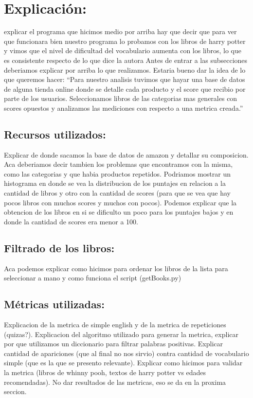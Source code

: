 \documentclass[12pt,journal,compsoc]{IEEEtran}
\begin{document}
\section{Explicación:} 
explicar el programa que hicimos medio por arriba
hay que decir que para ver que funcionara bien nuestro programa lo probamos con los libros de harry potter y vimos que el nivel de dificultad del vocabulario aumenta con los libros, lo que es consistente respecto de lo que dice la autora
Antes de entrar a las subsecciones deberiamos explicar por arriba lo que realizamos. Estaria bueno dar la idea de lo que queremos hacer: ``Para nuestro analisis tuvimos que hayar una base de datos de alguna tienda online donde se detalle cada producto y el score que recibio por parte de los usuarios. Seleccionamos libros de las categorias mas generales con scores opuestos y analizamos las mediciones con respecto a una metrica creada.''
\subsection{Recursos utilizados:}
 Explicar de donde sacamos la base de datos de amazon y detallar su composicion. Aca deberiamos decir tambien los problemas que encontramos con la misma, como las categorias y que habia productos repetidos. Podriamos mostrar un histograma en donde se vea la distribucion de los puntajes en relacion a la cantidad de libros y otro con la cantidad de scores (para que se vea que hay pocos libros con muchos scores y muchos con pocos). Podemos explicar que la obtencion de los libros en si se dificulto un poco para los puntajes bajos y en donde la cantidad de scores era menor a 100.
\subsection{Filtrado de los libros:} Aca podemos explicar como hicimos para ordenar los libros de la lista para seleccionar a mano y como funciona el script (getBooks.py)
\subsection{Métricas utilizadas:} Explicacion de la metrica de simple english y de la metrica de repeticiones (quizas?). Explicacion del algoritmo utilizado para generar la metrica, explicar por que utilizamos un diccionario para filtrar palabras positivas. Explicar cantidad de apariciones (que al final no nos sirvio) contra cantidad de vocabulario simple (que es la que se presento relevante). Explicar como hicimos para validar la metrica (libros de whinny pooh, textos de harry potter vs edades recomendadas). No dar resultados de las metricas, eso se da en la proxima seccion.
\end{document}

